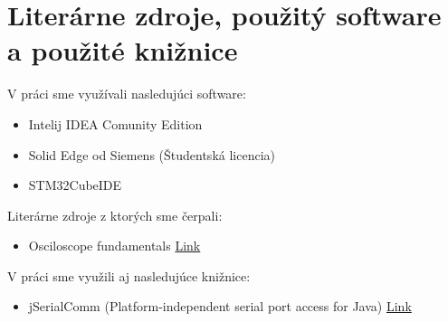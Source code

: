 \documentclass[main.tex]{subfiles}
\begin{document}
	\section{Literárne zdroje, použitý software a použité knižnice}
		\begin{multicols*}{2}
			V práci sme využívali nasledujúci software:
				\begin{itemize}
					\item Intelij IDEA Comunity Edition
					\item Solid Edge od Siemens (Študentská licencia)
					\item STM32CubeIDE
				\end{itemize}
			Literárne zdroje z ktorých sme čerpali:
				\begin{itemize}
				\item Osciloscope fundamentals \href{https://engineering.case.edu/lab/circuitslab/sites/engineering.case.edu.lab.circuitslab/files/docs/Oscilloscope_Fundamentals_-_Tektronix.pdf}{Link}
			\end{itemize}
			V práci sme využili aj nasledujúce knižnice:
			\begin{itemize}
				\item jSerialComm (Platform-independent serial port access for Java) \href{http://fazecast.github.io/jSerialComm/}{Link}
			\end{itemize}
		\end{multicols*}
\end{document}
